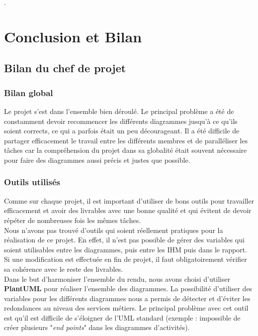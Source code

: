 .

\chapter*{Conclusion et Bilan}
\setcounter{section}{0}

\section*{Bilan du chef de projet}

\subsection*{Bilan global}
Le projet s'est dans l’ensemble bien déroulé. Le principal problème a été de constamment devoir recommencer les différents diagrammes jusqu'à ce qu'ils soient corrects, ce qui a parfois était un peu décourageant. Il a été difficile de partager efficacement le travail entre les différents membres et de paralléliser les tâches car la compréhension du projet dans sa globalité était souvent nécessaire pour faire des diagrammes aussi précis et justes que possible.

\subsection*{Outils utilisés}
Comme sur chaque projet, il est important d'utiliser de bons outils pour travailler efficacement et avoir des livrables avec une bonne qualité et qui évitent de devoir répéter de nombreuses fois les mêmes tâches.\\

Nous n'avons pas trouvé d'outils qui soient réellement pratiques pour la réalisation de ce projet. En effet, il n'est pas possible de gérer des variables qui soient utilisables entre les diagrammes, puis entre les IHM puis dans le rapport. Si une modification est effectuée en fin de projet, il faut obligatoirement vérifier sa cohérence avec le reste des livrables.\\

Dans le but d'harmoniser l'ensemble du rendu, nous avons choisi d'utiliser \textbf{PlantUML} pour réaliser l'ensemble des diagrammes. La possibilité d'utiliser des variables pour les différents diagrammes nous a permis de détecter et d'éviter les redondances au niveau des services métiers. Le principal problème avec cet outil est qu'il est difficile de s'éloigner de l'UML standard (exemple : impossible de créer plusieurs "\textit{end points}" dans les diagrammes d'activités).\\

